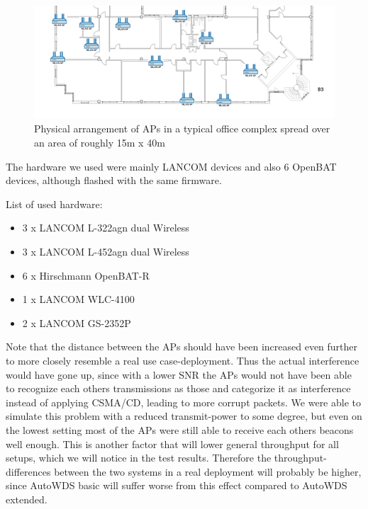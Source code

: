       \begin{figure}[h!]
	\centering
	\includegraphics[width=\columnwidth]{figures/Lancom-flur-withaps}
	\caption{Physical arrangement of APs in a typical office complex spread over an area of roughly 15m x 40m}
	\label{fig:2ndfloor}
      \end{figure}
      
      The hardware we used were mainly LANCOM devices and also 6 OpenBAT devices, although flashed with the same firmware.
     
      List of used hardware:
      \begin{itemize}
	\item 3 x LANCOM L-322agn dual Wireless \cite{lancom}
	\item 3 x LANCOM L-452agn dual Wireless
	\item 6 x Hirschmann OpenBAT-R
	\item 1 x LANCOM WLC-4100
	\item 2 x LANCOM GS-2352P
      \end{itemize}
      
      Note that the distance between the APs should have been increased even further to more closely resemble a real use case-deployment.
      Thus the actual interference would have gone up, since with a lower \ac{SNR} the APs would not have been able to recognize each others 
      transmissions as those and categorize it as interference instead of applying CSMA/CD, leading to more corrupt packets.
      We were able to simulate this problem with a reduced transmit-power to some degree,
      but even on the lowest setting most of the APs were still able to receive each others beacons well enough. 
      This is another factor that will lower general throughput for all setups, which we will notice in the test results.
      Therefore the throughput-differences between the two systems in a real deployment will probably be higher, since AutoWDS basic will suffer worse from this effect 
      compared to AutoWDS extended.
    
